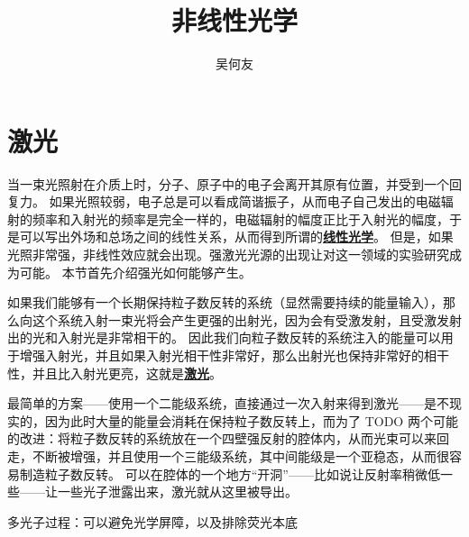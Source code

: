\documentclass[UTF8, a4paper]{ctexart}
\title{非线性光学}
\author{吴何友}
\newcommand{\concept}[1]{\underline{\textbf{#1}}}
\begin{document}
\maketitle

\section{激光}

当一束光照射在介质上时，分子、原子中的电子会离开其原有位置，并受到一个回复力。
如果光照较弱，电子总是可以看成简谐振子，从而电子自己发出的电磁辐射的频率和入射光的频率是完全一样的，电磁辐射的幅度正比于入射光的幅度，于是可以写出外场和总场之间的线性关系，从而得到所谓的\concept{线性光学}。
但是，如果光照非常强，非线性效应就会出现。强激光光源的出现让对这一领域的实验研究成为可能。
本节首先介绍强光如何能够产生。

如果我们能够有一个长期保持粒子数反转的系统（显然需要持续的能量输入），那么向这个系统入射一束光将会产生更强的出射光，因为会有受激发射，且受激发射出的光和入射光是非常相干的。
因此我们向粒子数反转的系统注入的能量可以用于增强入射光，并且如果入射光相干性非常好，那么出射光也保持非常好的相干性，并且比入射光更亮，这就是\concept{激光}。

最简单的方案——使用一个二能级系统，直接通过一次入射来得到激光——是不现实的，因为此时大量的能量会消耗在保持粒子数反转上，而为了 TODO
两个可能的改进：将粒子数反转的系统放在一个四壁强反射的腔体内，从而光束可以来回走，不断被增强，并且使用一个三能级系统，其中间能级是一个亚稳态，从而很容易制造粒子数反转。
可以在腔体的一个地方“开洞”——比如说让反射率稍微低一些——让一些光子泄露出来，激光就从这里被导出。

多光子过程：可以避免光学屏障，以及排除荧光本底
\end{document}
